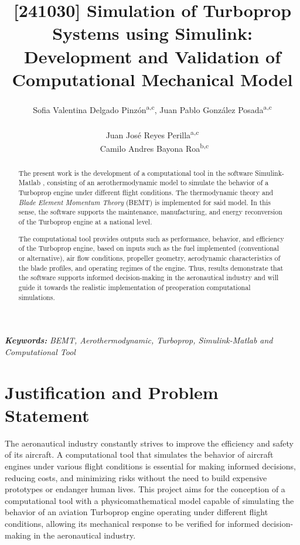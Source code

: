 \documentclass{Format}
\title{\LARGE[241030] Simulation of Turboprop Systems using Simulink: Development and Validation of Computational Mechanical Model}
\author{
\begin{tabular}{c}
\Large Sofia Valentina Delgado Pinzón\textsuperscript{a,c}, 
\Large Juan Pablo González Posada\textsuperscript{a,c}\\
\\
\Large Juan José Reyes Perilla\textsuperscript{a,c} \\
\
\Large Camilo Andres Bayona Roa\textsuperscript{b,c} \\
\end{tabular}
}
\begin{document}
\maketitle
\noindent\hrulefill
\begin{abstract}

The present work is the development of a computational tool in the software Simulink-Matlab \cite{SimulinkMathworks}, consisting of an aerothermodynamic model to simulate the behavior of a Turboprop engine under different flight conditions. The thermodynamic theory and \textit{Blade Element Momentum Theory} (BEMT) \cite{Winarto2004BEMT} is implemented for said model. In this sense, the software supports the maintenance, manufacturing, and energy reconversion of the Turboprop engine at a national level.

The computational tool provides outputs such as performance, behavior, and efficiency of the Turboprop engine, based on inputs such as the fuel implemented (conventional or alternative), air flow conditions, propeller geometry, aerodynamic characteristics of the blade profiles, and operating regimes of the engine. Thus, results demonstrate that the software supports informed decision-making in the aeronautical industry and will guide it towards the realistic implementation of preoperation computational simulations.

\end{abstract}
\begin{center}
\textbf{\textit{\fontsize{8}{10}\selectfont Keywords:}} \textit{\fontsize{8}{10}\selectfont BEMT, Aerothermodynamic, Turboprop, Simulink-Matlab and Computational Tool}
\end{center}

\noindent\hrulefill


\section{\bfseries\fontsize{10}{12}\selectfont Justification and Problem Statement}\label{sec:intro}

The aeronautical industry constantly strives to improve the efficiency and safety of its aircraft. A computational tool that simulates the behavior of aircraft engines under various flight conditions is essential for making informed decisions, reducing costs, and minimizing risks without the need to build expensive prototypes or endanger human lives. This project aims for the conception of a computational tool with a physicomathematical model capable of simulating the behavior of an aviation Turboprop engine operating under different flight conditions, allowing its mechanical response to be verified for informed decision-making in the aeronautical industry.
\end{document}
